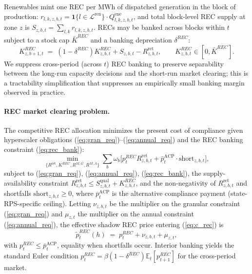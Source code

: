 \documentclass[12pt,letterpaper]{article}
\begin{document}
Renewables mint one REC per MWh of dispatched generation in the block of
production: $r_{l,k,z,b,t} = \mathbf{1}\{l \in \mathcal{L}^{\text{ren}}\}
\cdot Q^{\text{ene}}_{l,k,z,b,t}$, and total block-level REC supply at
zone $z$ is $S_{z,b,t} = \sum_{l,k} r_{l,k,z,b,t}$. RECs may be banked
across blocks within $t$ subject to a stock cap $\bar K^{REC}$ and a
banking depreciation $\delta^{REC}$:
\begin{equation}
\label{eq:rec_bank}
K^{REC}_{z,b+1,t} \;=\; (1 - \delta^{REC}) K^{REC}_{z,b,t}
+ S_{z,b,t} - R^{\text{ret}}_{z,b,t},
\qquad K^{REC}_{z,b,t} \in [0, \bar K^{REC}].
\end{equation}
We suppress cross-period (across $t$) REC banking to preserve separability
between the long-run capacity decisions and the short-run market clearing;
this is a tractability simplification that suppresses an empirically
small banking margin observed in practice.

\paragraph{REC market clearing problem.} The competitive REC allocation
minimizes the present cost of compliance given hyperscaler obligations
(\ref{eq:gran_req})--(\ref{eq:annual_req}) and the REC banking constraint
(\ref{eq:rec_bank}):
\begin{equation}
\label{eq:rec_problem}
\min_{\{R^{\text{ret}}, K^{REC}, R^{M,G}, R^{M,A}\}}
\sum_b \omega_b \big[ p^{REC}_t R^{\text{ret}}_{z,b,t}
+ \bar p^{\text{ACP}}_t \cdot \text{short}_{z,b,t} \big],
\end{equation}
subject to (\ref{eq:gran_req}), (\ref{eq:annual_req}), (\ref{eq:rec_bank}),
the supply-availability constraint
$R^{\text{ret}}_{z,b,t} \leq S^{\text{qual}}_{z,b,t} + K^{REC}_{z,b,t}$,
and the non-negativity of $R^{\text{ret}}_{z,b,t}$ and shortfalls
$\text{short}_{z,b,t} \geq 0$, where $\bar p^{\text{ACP}}_t$ is the
alternative compliance payment (state-RPS-specific ceiling). Letting
$\nu_{z,b,t}$ be the multiplier on the granular constraint
(\ref{eq:gran_req}) and $\mu_{z,t}$ the multiplier on the annual
constraint (\ref{eq:annual_req}), the effective shadow REC price entering
(\ref{eq:c_rec}) is
\begin{equation}
\label{eq:rec_shadow}
\tilde p^{REC}_t(h) \;=\; p^{REC}_t + \nu_{z,b,t} + \mu_{z,t},
\end{equation}
with $p^{REC}_t \leq \bar p^{\text{ACP}}_t$, equality when shortfalls
occur. Interior banking yields the standard Euler condition
$p^{REC}_t = \beta(1 - \delta^{REC}) \mathbb{E}_t[p^{REC}_{t+1}]$ for
the cross-period market.
\end{document}
